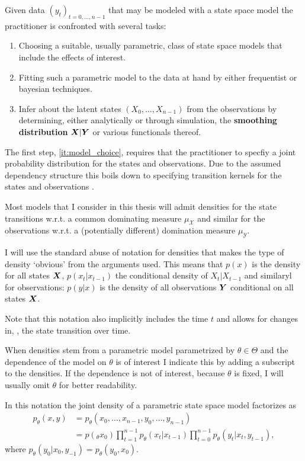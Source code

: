 Given data $(y_t)_{t = 0, \dots, n - 1}$ that may be modeled with a state space model the practitioner is confronted with several tasks:

\begin{enumerate}
    \item\label{it:model_choice} Choosing a suitable, usually parametric, class of state space models that include the effects of interest.
    \item\label{it:model_fitting} Fitting such a parametric model to the data at hand by either frequentist or bayesian techniques.
    \item\label{it:smoothing_problem} Infer about the latent states $(X_0, \dots, X_{n-1})$ from the observations by determining, either analytically or through simulation, the \textbf{smoothing distribution} $\boldsymbol{X}|\boldsymbol{Y}$ or various functionals thereof.
\end{enumerate}


The first step, \cref{it:model_choice}, requires that the practitioner to specfiy a joint probability distribution for the states and observations.
Due to the assumed dependency structure this boils down to specifying transition kernels for the states and observations
. 

Most models that I consider in this thesis will admit densities for the state transitions w.r.t. a common dominating measure $\mu_{\mathcal X}$ and similar for the observations w.r.t. a (potentially different) domination measure $\mu_{\mathcal Y}$.  

\begin{notation}
    I will use the standard abuse of notation for densities that makes the type of density `obvious' from the arguments used.
    This means that $p(x)$ is the density for all states $\boldsymbol{X}$, $p(x_t|x_{t - 1})$ the conditional density of $X_t|X_{t - 1}$ and similaryl for 
    observations: $p(y|x)$ is the density of all observations $\boldsymbol{Y}$ conditional on all states $\boldsymbol{X}$.

    Note that this notation also implicitly includes the time $t$ and allows for changes in, \eg, the state transition over time.

    When densities stem from a parametric model parametrized by $\theta \in \Theta$ and the dependence of the model on $\theta$ is of interest I indicate this by adding a subscript to the densities.
    If the dependence is not of interest, \eg because $\theta$ is fixed, I will usually omit $\theta$ for better readability.

    In this notation the joint density of a parametric state space model factorizes as
    \begin{align*}
        p_\theta(x,y) &= p_\theta(x_0, \dots, x_{n - 1}, y_0, \dots, y_{n - 1}) \\
        &= p(_\theta x_0)\prod_{t = 1}^{n - 1} p_\theta(x_{t}|x_{t - 1}) \prod_{t = 0}^{n - 1} p_\theta(y_t | x_t, y_{t - 1}),
    \end{align*}
    where $p_\theta(y_0|x_0, y_{-1}) = p_\theta(y_0, x_0)$. 

\end{notation}
    
